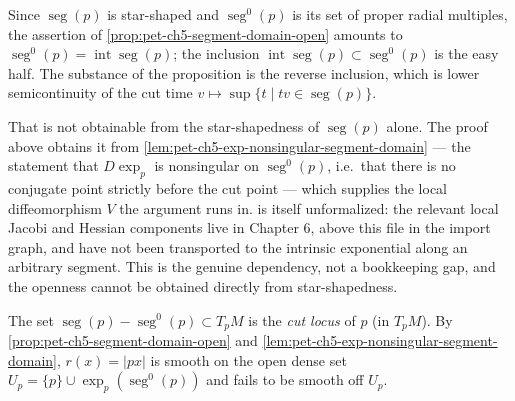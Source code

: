 \begin{remark}
  \label{rem:pet-ch5-segment-domain-open-blocker}
  Since $\operatorname{seg}(p)$ is star-shaped and $\operatorname{seg}^0(p)$ is its
  set of proper radial multiples, the assertion of
  \cref{prop:pet-ch5-segment-domain-open} amounts to
  $\operatorname{seg}^0(p)=\operatorname{int}\operatorname{seg}(p)$; the inclusion
  $\operatorname{int}\operatorname{seg}(p)\subset\operatorname{seg}^0(p)$ is the
  easy half. The substance of the proposition is the reverse inclusion, which is
  lower semicontinuity of the cut time $v\mapsto\sup\{t\mid tv\in
  \operatorname{seg}(p)\}$.

  That is not obtainable from the star-shapedness of $\operatorname{seg}(p)$ alone.
  The proof above obtains it from
  \cref{lem:pet-ch5-exp-nonsingular-segment-domain} — the statement that $D\exp_p$
  is nonsingular on $\operatorname{seg}^0(p)$, i.e.\ that there is no conjugate
  point strictly before the cut point — which supplies the local diffeomorphism $V$
  the argument runs in.  is itself
  unformalized: the relevant local Jacobi and Hessian components live in Chapter 6,
  above this file in the import graph, and have not been transported to the intrinsic
  exponential along an arbitrary segment. This is the genuine dependency, not a
  bookkeeping gap, and the openness cannot be obtained directly from star-shapedness.
\end{remark}

\begin{definition}
  \label{def:pet-ch5-cut-locus}


  The set $\operatorname{seg}(p)-\operatorname{seg}^0(p)\subset T_pM$ is the
  \emph{cut locus} of $p$ (in $T_pM$). By
  \cref{prop:pet-ch5-segment-domain-open} and
  \cref{lem:pet-ch5-exp-nonsingular-segment-domain},
  $r(x)=|px|$ is smooth on the open dense set $U_p=\{p\}\cup\exp_p(\operatorname{seg}^0(p))$
  and fails to be smooth off $U_p$.
\end{definition}

